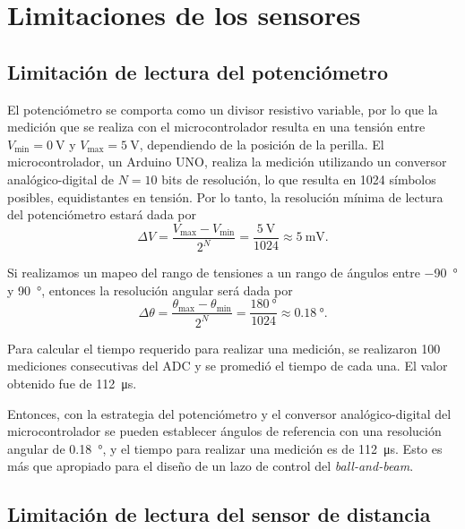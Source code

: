 \section{Limitaciones de los sensores}

\subsection{Limitación de lectura del potenciómetro}

El potenciómetro se comporta como un divisor resistivo variable, por lo que la medición que se realiza con el microcontrolador resulta en una tensión entre $V_{\min} = \qty{0}{\V}$ y $V_{\max} = \qty{5}{\V}$, dependiendo de la posición de la perilla. El microcontrolador, un Arduino UNO, realiza la medición utilizando un conversor analógico-digital de $N = 10$ bits de resolución, lo que resulta en 1024 símbolos posibles, equidistantes en tensión. Por lo tanto, la resolución mínima de lectura del potenciómetro estará dada por
\begin{equation*}
    \Delta V = \frac{V_{\max} - V_{\min}}{2^N} = \frac{\qty{5}{\V}}{1024} \approx \qty{5}{\mV}.
\end{equation*}

Si realizamos un mapeo del rango de tensiones a un rango de ángulos entre \qty{-90}{\degree} y \qty{90}{\degree}, entonces la resolución angular será dada por
\begin{equation*}
    \Delta \theta = \frac{\theta_{\max} - \theta_{\min}}{2^N} = \frac{\qty{180}{\degree}}{1024} \approx \qty{0.18}{\degree}.
\end{equation*}

Para calcular el tiempo requerido para realizar una medición, se realizaron 100 mediciones consecutivas del ADC y se promedió el tiempo de cada una. El valor obtenido fue de \qty{112}{\us}.

Entonces, con la estrategia del potenciómetro y el conversor analógico-digital del microcontrolador se pueden establecer ángulos de referencia con una resolución angular de \qty{0.18}{\degree}, y el tiempo para realizar una medición es de \qty{112}{\us}. Esto es más que apropiado para el diseño de un lazo de control del \emph{ball-and-beam}.

\subsection{Limitación de lectura del sensor de distancia}


